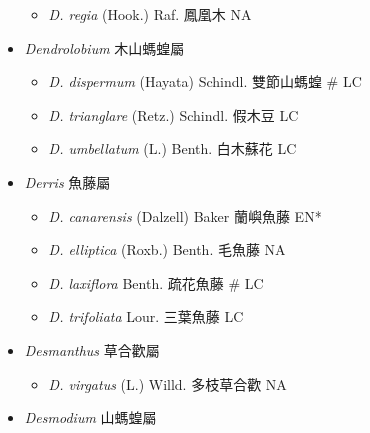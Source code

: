 \begin{itemize}
  \begin{itemize}
        \item[] \textit{D. regia} (Hook.) Raf.  鳳凰木   NA
  \end{itemize}
 \item[] \textit{Dendrolobium} 木山螞蝗屬
                                
  \begin{itemize}
        \item[] \textit{D. dispermum} (Hayata) Schindl.  雙節山螞蝗  \# LC
        \item[] \textit{D. trianglare} (Retz.) Schindl.  假木豆   LC
        \item[] \textit{D. umbellatum} (L.) Benth.  白木蘇花   LC
  \end{itemize}
 \item[] \textit{Derris} 魚藤屬
                                
  \begin{itemize}
        \item[] \textit{D. canarensis} (Dalzell) Baker  蘭嶼魚藤   EN*
        \item[] \textit{D. elliptica} (Roxb.) Benth.  毛魚藤   NA
        \item[] \textit{D. laxiflora} Benth.  疏花魚藤  \# LC
        \item[] \textit{D. trifoliata} Lour.  三葉魚藤   LC
  \end{itemize}
 \item[] \textit{Desmanthus} 草合歡屬
                                
  \begin{itemize}
        \item[] \textit{D. virgatus} (L.) Willd.  多枝草合歡   NA
  \end{itemize}
 \item[] \textit{Desmodium} 山螞蝗屬
                                

\end{itemize}
